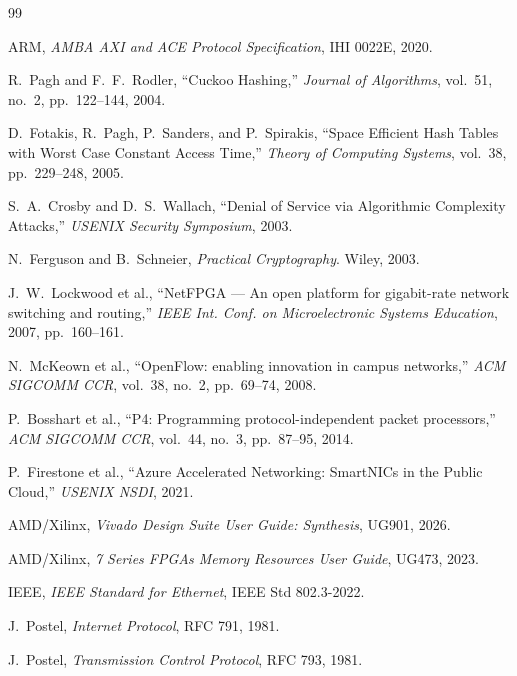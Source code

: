 \documentclass[12pt,twoside,openright]{book}
\begin{document}
\begin{thebibliography}{99}

ARM, \emph{AMBA AXI and ACE Protocol Specification}, IHI 0022E, 2020.

R.~Pagh and F.~F.~Rodler, ``Cuckoo Hashing,'' \emph{Journal of Algorithms}, vol.~51, no.~2,
pp.~122--144, 2004.

D.~Fotakis, R.~Pagh, P.~Sanders, and P.~Spirakis, ``Space Efficient Hash Tables with Worst Case
Constant Access Time,'' \emph{Theory of Computing Systems}, vol.~38, pp.~229--248, 2005.

S.~A.~Crosby and D.~S.~Wallach, ``Denial of Service via Algorithmic Complexity Attacks,''
\emph{USENIX Security Symposium}, 2003.

N.~Ferguson and B.~Schneier, \emph{Practical Cryptography}. Wiley, 2003.

J.~W.~Lockwood et al., ``NetFPGA --- An open platform for gigabit-rate network switching and
routing,'' \emph{IEEE Int. Conf. on Microelectronic Systems Education}, 2007, pp.~160--161.

N.~McKeown et al., ``OpenFlow: enabling innovation in campus networks,'' \emph{ACM SIGCOMM CCR},
vol.~38, no.~2, pp.~69--74, 2008.

P.~Bosshart et al., ``P4: Programming protocol-independent packet processors,'' \emph{ACM SIGCOMM
CCR}, vol.~44, no.~3, pp.~87--95, 2014.

P.~Firestone et al., ``Azure Accelerated Networking: SmartNICs in the Public Cloud,''
\emph{USENIX NSDI}, 2021.

AMD/Xilinx, \emph{Vivado Design Suite User Guide: Synthesis}, UG901, 2026.

AMD/Xilinx, \emph{7 Series FPGAs Memory Resources User Guide}, UG473, 2023.

IEEE, \emph{IEEE Standard for Ethernet}, IEEE Std 802.3-2022.

J.~Postel, \emph{Internet Protocol}, RFC 791, 1981.

J.~Postel, \emph{Transmission Control Protocol}, RFC 793, 1981.

\end{thebibliography}

\cleardoublepage
{}
{}
\printindex
\end{document}
